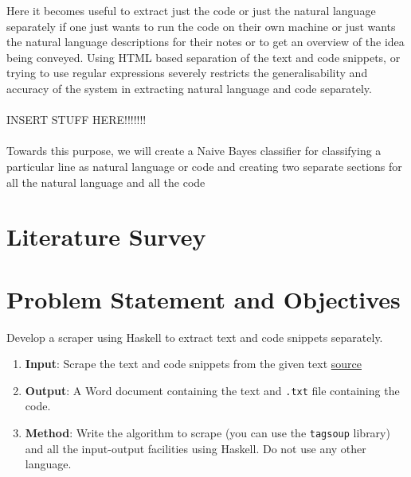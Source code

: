 \documentclass[12pt]{scrreprt}
\begin{document}
Here it becomes useful to extract just the code or just the natural language separately if one just wants to run the code on their own machine or just wants the natural language descriptions for their notes or to get an overview of the idea being conveyed. Using HTML based separation of the text and code snippets, or trying to use regular expressions severely restricts the generalisability and accuracy of the system in extracting natural language and code separately.\\
\\ INSERT STUFF HERE!!!!!!!\\
\\ Towards this purpose, we will create a Naive Bayes classifier for classifying a particular line as natural language or code and creating two separate sections for all the natural language and all the code

\chapter{Literature Survey}








\chapter{Problem Statement and Objectives}
\begin{tcolorbox}[colback=white,colframe=gray,title={Assigned Project Statement}]
    Develop a scraper using Haskell to extract text and code snippets separately.
    \begin{enumerate}
        \item \textbf{Input}: Scrape the text and code snippets from the given text \href{https://eli.thegreenplace.net/2018/type-erasure-and-reification/}{source}
        \item \textbf{Output}: A Word document containing the text and \texttt{.txt} file containing the code.
        \item \textbf{Method}: Write the algorithm to scrape (you can use the \texttt{tagsoup} library) and all the input-output facilities using Haskell. Do not use any other language.
    \end{enumerate}
\end{tcolorbox}
\end{document}
